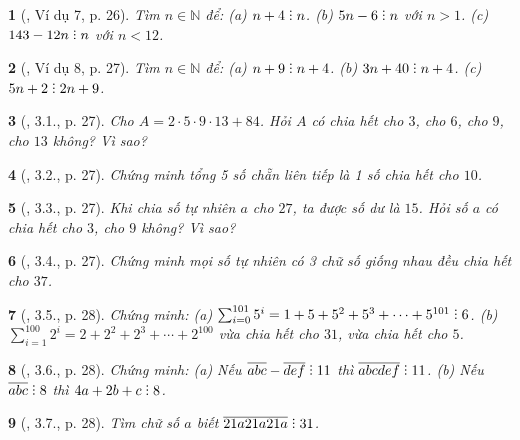 \documentclass{article}
\newtheorem{baitoan}{}
\DeclareRobustCommand{\divby}{%
	\mathrel{\vbox{\baselineskip.65ex\lineskiplimit0pt\hbox{.}\hbox{.}\hbox{.}}}%
}
\begin{document}
\begin{baitoan}[\cite{Binh_boi_duong_Toan_6_tap_1}, Ví dụ 7, p. 26]
	Tìm $n\in\mathbb{N}$ để: (a) $n + 4\divby n$. (b) $5n - 6\divby n$ với $n > 1$. (c) $143 - 12n\divby n$ với $n < 12$.
\end{baitoan}

\begin{baitoan}[\cite{Binh_boi_duong_Toan_6_tap_1}, Ví dụ 8, p. 27]
	Tìm $n\in\mathbb{N}$ để: (a) $n + 9\divby n + 4$. (b) $3n + 40\divby n + 4$. (c) $5n + 2\divby2n + 9$.
\end{baitoan}

\begin{baitoan}[\cite{Binh_boi_duong_Toan_6_tap_1}, 3.1., p. 27]
	Cho $A = 2\cdot5\cdot9\cdot13 + 84$. Hỏi $A$ có chia hết cho $3$, cho $6$, cho $9$, cho $13$ không? Vì sao?
\end{baitoan}

\begin{baitoan}[\cite{Binh_boi_duong_Toan_6_tap_1}, 3.2., p. 27]
	Chứng minh tổng 5 số chẵn liên tiếp là 1 số chia hết cho $10$.
\end{baitoan}

\begin{baitoan}[\cite{Binh_boi_duong_Toan_6_tap_1}, 3.3., p. 27]
	Khi chia số tự nhiên $a$ cho $27$, ta được số dư là $15$. Hỏi số $a$ có chia hết cho $3$, cho $9$ không? Vì sao?
\end{baitoan}

\begin{baitoan}[\cite{Binh_boi_duong_Toan_6_tap_1}, 3.4., p. 27]
	Chứng minh mọi số tự nhiên có 3 chữ số giống nhau đều chia hết cho $37$.
\end{baitoan}

\begin{baitoan}[\cite{Binh_boi_duong_Toan_6_tap_1}, 3.5., p. 28]
	Chứng minh: (a) $\sum_{i=0}^{101} 5^i = 1 + 5 + 5^2 + 5^3 + \cdots + 5^{101}\divby6$. (b) $\sum_{i=1}^{100} 2^i = 2 + 2^2 + 2^3 + \cdots + 2^{100}$ vừa chia hết cho $31$, vừa chia hết cho $5$.
\end{baitoan}

\begin{baitoan}[\cite{Binh_boi_duong_Toan_6_tap_1}, 3.6., p. 28]
	Chứng minh: (a) Nếu $\overline{abc} - \overline{def}\divby11$ thì $\overline{abcdef}\divby11$. (b) Nếu $\overline{abc}\divby8$ thì $4a + 2b + c\divby8$.
\end{baitoan}

\begin{baitoan}[\cite{Binh_boi_duong_Toan_6_tap_1}, 3.7., p. 28]
	Tìm chữ số $a$ biết $\overline{21a21a21a}\divby31$.
\end{baitoan}
\end{document}
